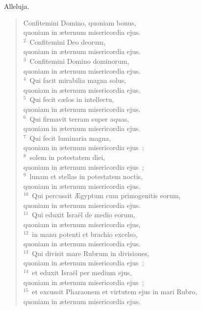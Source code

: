 \bchapter
\lettrine[lines=3,image=true,loversize=0.05,lraise=-0.03]{A}{}lleluja. \begin{flushleft}\begin{verse}\vspace{6pt}Confitemini Domino, quoniam bonus,\\ quoniam in \ae ternum misericordia ejus.\\
${}^{2}$~Confitemini Deo deorum,\\ quoniam in \ae ternum misericordia ejus.\\
${}^{3}$~Confitemini Domino dominorum,\\ quoniam in \ae ternum misericordia ejus.\\
${}^{4}$~Qui facit mirabilia magna solus,\\ quoniam in \ae ternum misericordia ejus.\\
${}^{5}$~Qui fecit c\ae los in intellectu,\\ quoniam in \ae ternum misericordia ejus.\\
${}^{6}$~Qui firmavit terram super aquas,\\ quoniam in \ae ternum misericordia ejus.\\
${}^{7}$~Qui fecit luminaria magna,\\ quoniam in \ae ternum misericordia ejus~:\\
${}^{8}$~solem in potestatem diei,\\ quoniam in \ae ternum misericordia ejus~;\\
${}^{9}$~lunam et stellas in potestatem noctis,\\ quoniam in \ae ternum misericordia ejus.\\
${}^{10}$~Qui percussit \AE gyptum cum primogenitis eorum,\\ quoniam in \ae ternum misericordia ejus.\\
${}^{11}$~Qui eduxit Isra\"el de medio eorum,\\ quoniam in \ae ternum misericordia ejus,\\
${}^{12}$~in manu potenti et brachio excelso,\\ quoniam in \ae ternum misericordia ejus.\\
${}^{13}$~Qui divisit mare Rubrum in divisiones,\\ quoniam in \ae ternum misericordia ejus~;\\
${}^{14}$~et eduxit Isra\"el per medium ejus,\\ quoniam in \ae ternum misericordia ejus~;\\
${}^{15}$~et excussit Pharaonem et virtutem ejus in mari Rubro,\\ quoniam in \ae ternum misericordia ejus.\\

\end{verse}
\end{flushleft}
